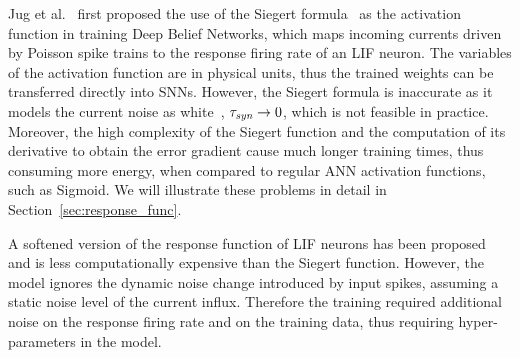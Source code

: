 	Jug et al.~\cite{Jug_etal_2012} first proposed the use of the Siegert formula~\cite{siegert1951first} as the activation function in training Deep Belief Networks, which maps incoming currents driven by Poisson spike trains to the response firing rate of an LIF neuron.
	The variables of the activation function are in physical units, thus the trained weights can be transferred directly into SNNs.
	However, the Siegert formula is inaccurate as it models the current noise as white~\cite{liu2016noisy}, $\tau_{\textit{\textrm{syn}}} \to 0$, which is not feasible in practice.
	Moreover, the high complexity of the Siegert function and the computation of its derivative to obtain the error gradient cause much longer training times, thus consuming more energy, when compared to regular ANN activation functions, such as Sigmoid.
	We will illustrate these problems in detail in Section~\ref{sec:response_func}. %
	
	A softened version of the response function of LIF neurons has been proposed~\cite{hunsberger2015spiking} and is less computationally expensive than the Siegert function.
	However, the model ignores the dynamic noise change introduced by input spikes, assuming a static noise level of the current influx.
	Therefore the training required additional noise on the response firing rate and on the training data, thus requiring hyper-parameters in the model.
	
